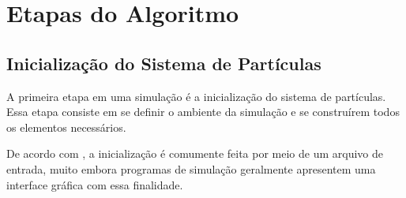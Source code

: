 \section{Etapas do Algoritmo} \label{sec:algorithm_steps}

\subsection{Inicialização do Sistema de Partículas}

A primeira etapa em uma simulação \DEM{} é a inicialização do sistema de partículas. Essa etapa consiste em se definir o ambiente da simulação e se construírem todos os elementos necessários.

De acordo com , a inicialização é comumente feita por meio de um arquivo de entrada, muito embora programas de simulação geralmente apresentem uma interface gráfica com essa finalidade. 

